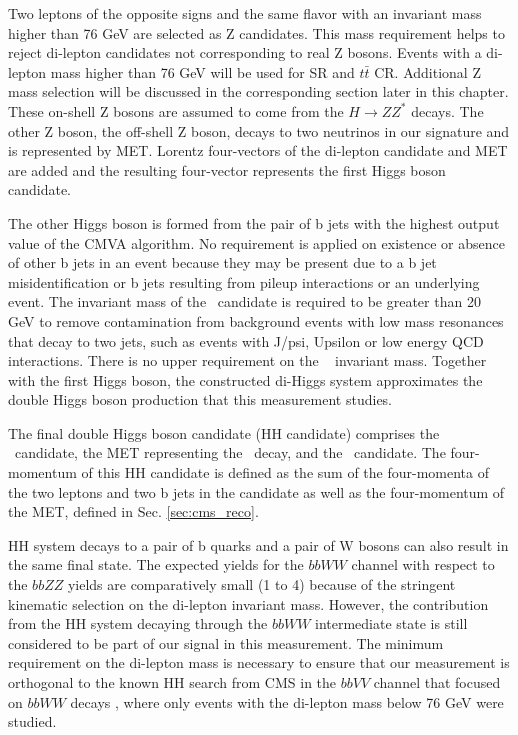 Two leptons of the opposite signs and the same flavor with an invariant mass higher than 76 GeV are selected as Z candidates. This mass requirement helps to reject di-lepton candidates not corresponding to real Z bosons. Events with a di-lepton mass higher than 76 GeV will be used for SR and $t\bar{t}$ CR. Additional Z mass selection will be discussed in the corresponding section later in this chapter. These on-shell Z bosons are assumed to come from the $H \to Z Z^*$ decays. The other Z boson, the off-shell Z boson, decays to two neutrinos in our signature and is represented by MET. Lorentz four-vectors of the di-lepton candidate and MET are added and the resulting four-vector represents the first Higgs boson candidate. 

The other Higgs boson is formed from the pair of b jets with the highest output value of the CMVA algorithm. No requirement is applied on existence or absence of other b jets in an event because they may be present due to a b jet misidentification or b jets resulting from pileup interactions or an underlying event. The invariant mass of the \HBB~candidate is required to be greater than 20 GeV to remove contamination from background events with low mass resonances that decay to two jets, such as events with J/psi, Upsilon or low energy QCD interactions. There is no upper requirement on the \HBB~ invariant mass. Together with the first Higgs boson, the constructed di-Higgs system approximates the double Higgs boson production that this measurement studies. 

The final double Higgs boson candidate (HH candidate) comprises the \Zll~candidate, the MET representing the \Znn~decay, and the \HBB~candidate. The four-momentum of this HH candidate is defined as the sum of the four-momenta of the two leptons and two b jets in the candidate as well as the four-momentum of the MET, defined in Sec. \ref{sec:cms_reco}.

HH system decays to a pair of b quarks and a pair of W bosons can also result in the same final state. The expected yields for the $bbWW$ channel with respect to the $bbZZ$ yields are comparatively small (1 to 4) because of the stringent kinematic selection on the di-lepton invariant mass. However, the contribution from the HH system decaying through the $bbWW$ intermediate state is still considered to be part of our signal in this measurement. The minimum requirement on the di-lepton mass is necessary to ensure that our measurement is orthogonal to the known HH search from CMS in the $bbVV$ channel that focused on $bbWW$ decays \cite{bbWW}, where only events with the di-lepton mass below 76 GeV were studied.

